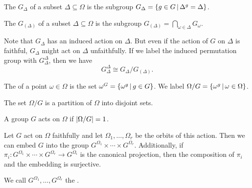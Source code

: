 \begin{definition}
  The  $G_\Delta$ of a subset $\Delta \subseteq \Omega$ is
  the subgroup $G_\Delta = \{ g \in G \,|\, \Delta^g = \Delta \}$.
\end{definition}

\begin{definition}
  The  $G_{(\Delta)}$ of a subset $\Delta \subseteq
  \Omega$ is the subgroup $G_{(\Delta)} = \bigcap_{\omega \in \Delta} G_\omega$.
\end{definition}

\begin{remark}
  Note that $G_\Delta$ has an induced action on $\Delta$.
  But even if the action of $G$ on $\Delta$ is faithful, $G_\Delta$ might act on
  $\Delta$ unfaithfully.
  If we label the induced permutation group with $G_\Delta^\Delta$, then we have
  \[
	G_\Delta^\Delta \cong G_\Delta / G_{(\Delta)}.
  \]
\end{remark}

\begin{definition}
  The  of a point $\omega \in \Omega$ is the set $\omega^G = \{
  \omega^g \,|\, g \in G \}$.
  We label $\Omega / G = \{ \omega^g \,|\, \omega \in \Omega \}$.
\end{definition}

\begin{remark}
  The set $\Omega / G$ is a partition of $\Omega$ into disjoint sets.
\end{remark}

\begin{definition}
  A group $G$ acts  on $\Omega$ if $\left| \Omega / G \right| = 1$.
\end{definition}

\begin{lemma}
  Let $G$ act on $\Omega$ faithfully and let $\Omega_1, \ldots, \Omega_r$ be the
  orbits of this action.
  Then we can embed $G$ into the group $G^{\Omega_1} \times \cdots \times
  G^{\Omega_r}$.
  Additionally, if $\pi_i : G^{\Omega_1} \times \cdots \times G^{\Omega_r} \to
  G^{\Omega_i}$ is the canonical projection, then the composition of $\pi_i$ and
  the embedding is surjective.
\end{lemma}

\begin{remark}
  We call $G^{\Omega_1}, \ldots, G^{\Omega_r}$ the .
\end{remark}

